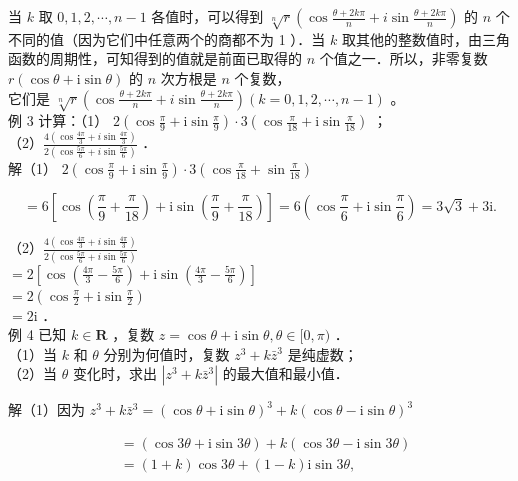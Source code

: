 \documentclass[10pt]{article}
\begin{document}
当 \(k\) 取 \(0,1,2, \cdots, n-1\) 各值时，可以得到 \(\sqrt[n]{r}\left(\cos \frac{\theta+2 k \pi}{n}+i \sin \frac{\theta+2 k \pi}{n}\right)\) 的 \(n\) 个不同的值（因为它们中任意两个的商都不为 1 ）．当 \(k\) 取其他的整数值时，由三角函数的周期性，可知得到的值就是前面已取得的 \(n\) 个值之一．所以，非零复数 \(r(\cos \theta+\mathrm{i} \sin \theta)\) 的 \(n\) 次方根是 \(n\) 个复数，\\
它们是 \(\sqrt[n]{r}\left(\cos \frac{\theta+2 k \pi}{n}+i \sin \frac{\theta+2 k \pi}{n}\right)(k=0,1,2, \cdots, n-1)\) 。\\
例 3 计算：（1） \(2\left(\cos \frac{\pi}{9}+\mathrm{i} \sin \frac{\pi}{9}\right) \cdot 3\left(\cos \frac{\pi}{18}+\mathrm{i} \sin \frac{\pi}{18}\right)\) ；\\
（2）\(\frac{4\left(\cos \frac{4 \pi}{3}+i \sin \frac{4 \pi}{3}\right)}{2\left(\cos \frac{5 \pi}{6}+i \sin \frac{5 \pi}{6}\right)}\) ．\\
解（1） \(2\left(\cos \frac{\pi}{9}+\mathrm{i} \sin \frac{\pi}{9}\right) \cdot 3\left(\cos \frac{\pi}{18}+\sin \frac{\pi}{18}\right)\)

\[
=6\left[\cos \left(\frac{\pi}{9}+\frac{\pi}{18}\right)+\mathrm{i} \sin \left(\frac{\pi}{9}+\frac{\pi}{18}\right)\right]=6\left(\cos \frac{\pi}{6}+\mathrm{i} \sin \frac{\pi}{6}\right)=3 \sqrt{3}+3 \mathrm{i} .
\]

（2）\(\frac{4\left(\cos \frac{4 \pi}{3}+i \sin \frac{4 \pi}{3}\right)}{2\left(\cos \frac{5 \pi}{6}+i \sin \frac{5 \pi}{6}\right)}\)\\
\(=2\left[\cos \left(\frac{4 \pi}{3}-\frac{5 \pi}{6}\right)+\mathrm{i} \sin \left(\frac{4 \pi}{3}-\frac{5 \pi}{6}\right)\right]\)\\
\(=2\left(\cos \frac{\pi}{2}+\mathrm{i} \sin \frac{\pi}{2}\right)\)\\
\(=2 \mathrm{i}\) ．\\
例 4 已知 \(k \in \mathbf{R}\) ，复数 \(z=\cos \theta+\mathrm{i} \sin \theta, \theta \in[0, \pi)\) ．\\
（1）当 \(k\) 和 \(\theta\) 分别为何值时，复数 \(z^{3}+k \bar{z}^{3}\) 是纯虚数；\\
（2）当 \(\theta\) 变化时，求出 \(\left|z^{3}+k \bar{z}^{3}\right|\) 的最大值和最小值．

解（1）因为 \(z^{3}+k \bar{z}^{3}=(\cos \theta+\mathrm{i} \sin \theta)^{3}+k(\cos \theta-\mathrm{i} \sin \theta)^{3}\)

\[
\begin{aligned}
& =(\cos 3 \theta+\mathrm{i} \sin 3 \theta)+k(\cos 3 \theta-\mathrm{i} \sin 3 \theta) \\
& =(1+k) \cos 3 \theta+(1-k) \mathrm{i} \sin 3 \theta,
\end{aligned}
\]
\end{document}
